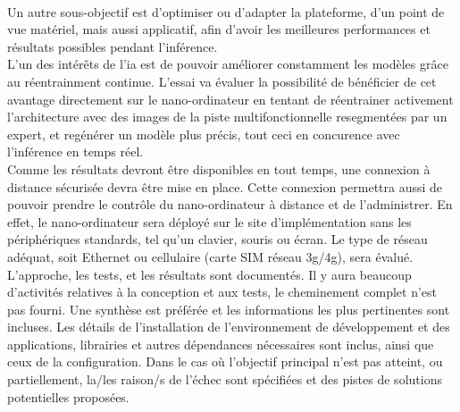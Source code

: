 \vspace{\baselineskip}
\\
\noindent Un autre sous-objectif est d'optimiser ou d'adapter la plateforme, d'un point de vue matériel, mais aussi applicatif, afin d'avoir les meilleures performances et résultats possibles pendant l'inférence.
\vspace{\baselineskip}
\\
\noindent L'un des intérêts de l'\acrshort{ia} est de pouvoir améliorer constamment les modèles grâce au réentrainment continue. L'essai va évaluer la possibilité de bénéficier de cet avantage directement sur le nano-ordinateur en tentant de réentrainer activement l'architecture avec des images de la piste multifonctionnelle resegmentées par un expert, et regénérer un modèle plus précis, tout ceci en concurence avec l'inférence en temps réel. 
\vspace{\baselineskip}
\\
\noindent Comme les résultats devront être disponibles en tout temps, une connexion à distance sécurisée devra être mise en place. Cette connexion permettra aussi de pouvoir prendre le contrôle du nano-ordinateur à distance et de l'administrer. En effet, le nano-ordinateur sera déployé sur le site d'implémentation sans les périphériques standards, tel qu'un clavier, souris ou écran. Le type de réseau adéquat, soit Ethernet ou cellulaire (carte SIM réseau 3g/4g), sera évalué.
\vspace{\baselineskip}
\\
\noindent L'approche, les tests, et les résultats sont documentés. Il y aura beaucoup d'activités relatives à la conception et aux tests, le cheminement complet n'est pas fourni. Une synthèse est préférée et les informations les plus pertinentes sont incluses. Les détails de l'installation de l'environnement de développement et des applications, librairies et autres dépendances nécessaires sont inclus, ainsi que ceux de la configuration. Dans le cas où l'objectif principal n'est pas atteint, ou partiellement, la/les raison/s de l'échec sont spécifiées et des pistes de solutions potentielles proposées.